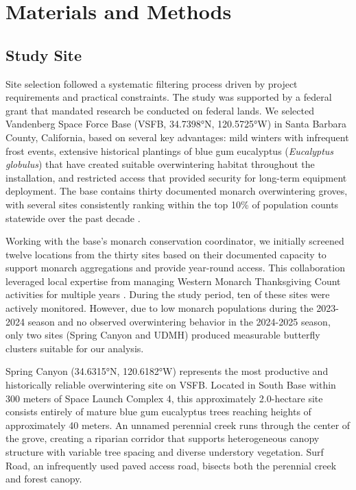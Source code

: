 \section{Materials and Methods}

\subsection{Study Site}

Site selection followed a systematic filtering process driven by project requirements and practical constraints. The study was supported by a federal grant that mandated research be conducted on federal lands. We selected Vandenberg Space Force Base (VSFB, 34.7398°N, 120.5725°W) in Santa Barbara County, California, based on several key advantages: mild winters with infrequent frost events, extensive historical plantings of blue gum eucalyptus (\textit{Eucalyptus globulus}) that have created suitable overwintering habitat throughout the installation, and restricted access that provided security for long-term equipment deployment. The base contains thirty documented monarch overwintering groves, with several sites consistently ranking within the top 10\% of population counts statewide over the past decade \autocite{xercesGuideWesternMonarch2025}. 

Working with the base's monarch conservation coordinator, we initially screened twelve locations from the thirty sites based on their documented capacity to support monarch aggregations and provide year-round access. This collaboration leveraged local expertise from managing Western Monarch Thanksgiving Count activities for multiple years \autocite{xercesGuideWesternMonarch2025}. During the study period, ten of these sites were actively monitored. However, due to low monarch populations during the 2023-2024 season and no observed overwintering behavior in the 2024-2025 season, only two sites (Spring Canyon and UDMH) produced measurable butterfly clusters suitable for our analysis.

Spring Canyon (34.6315°N, 120.6182°W) represents the most productive and historically reliable overwintering site on VSFB. Located in South Base within 300 meters of Space Launch Complex 4, this approximately 2.0-hectare site consists entirely of mature blue gum eucalyptus trees reaching heights of approximately 40 meters. An unnamed perennial creek runs through the center of the grove, creating a riparian corridor that supports heterogeneous canopy structure with variable tree spacing and diverse understory vegetation. Surf Road, an infrequently used paved access road, bisects both the perennial creek and forest canopy. 

